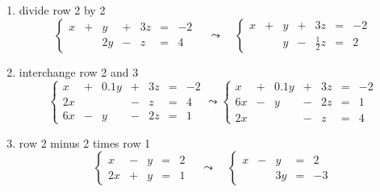 \bigskip

\noindent {\bf \ref{ssec.rreduction}}
\begin{enumerate}
\item divide row 2 by 2
$$\left \{ \begin{array}{rrrrrrr}
x&+&y&+&3z&=&-2\\
&&2y&-&z&=&4
\end{array} \right . \quad \leadsto \quad \left \{
\begin{array}{rrrrrrr}
x&+&y&+&3z&=&-2\\ &&y&-&\frac{1}{2}z&=&2
\end{array} \right .$$

\item interchange row 2 and 3
$$\left \{ \begin{array}{rrrrrrr}
x&+&0.1y&+&3z&=&-2\\
2x&&&-&z&=&4\\
6x&-&y&-&2z&=&1 \end{array} \right .  \leadsto
\left \{ \begin{array}{rrrrrrr}
x&+&0.1y&+&3z&=&-2\\
6x&-&y&-&2z&=&1 \\
2x&&&-&z&=&4
\end{array} \right .$$

\item row 2 minus 2 times row 1
$$\left \{ \begin{array}{rrrrr}
x&-&y&=&2\\
2x&+&y&=&1 \end{array} \right . \quad \leadsto \quad
\left \{ \begin{array}{rrrrr}
x&-&y&=&2\\
&&3y&=&-3 \end{array} \right .$$
\end{enumerate}

\bigskip

\noindent {\bf \ref{ssec.gausse}:}

